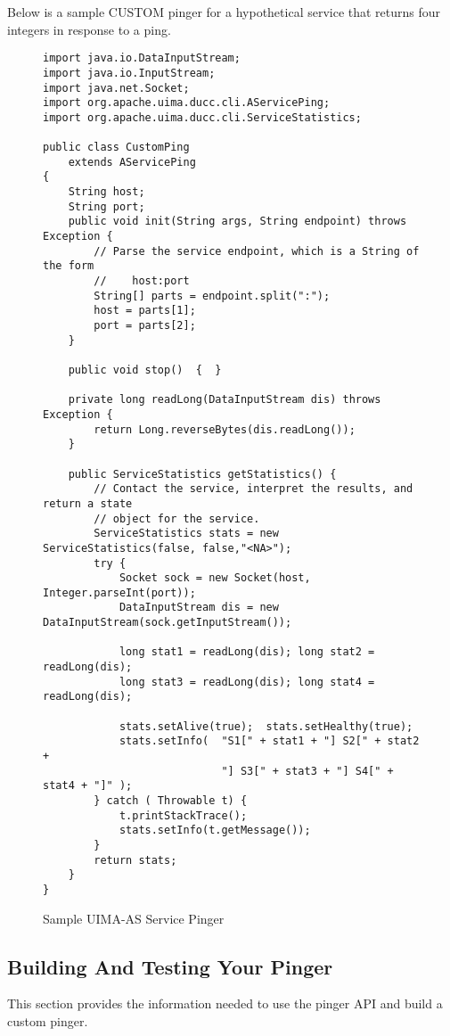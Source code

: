       Below is a sample CUSTOM pinger for a hypothetical service that returns four integers in
      response to a ping.
      \begin{figure}[H]
\begin{verbatim}
import java.io.DataInputStream;
import java.io.InputStream;
import java.net.Socket;
import org.apache.uima.ducc.cli.AServicePing;
import org.apache.uima.ducc.cli.ServiceStatistics;

public class CustomPing
    extends AServicePing
{
    String host;
    String port;
    public void init(String args, String endpoint) throws Exception {
        // Parse the service endpoint, which is a String of the form 
        //    host:port
        String[] parts = endpoint.split(":");
        host = parts[1];
        port = parts[2];
    }

    public void stop()  {  }

    private long readLong(DataInputStream dis) throws Exception {
        return Long.reverseBytes(dis.readLong());
    }

    public ServiceStatistics getStatistics() {
        // Contact the service, interpret the results, and return a state
        // object for the service.
        ServiceStatistics stats = new ServiceStatistics(false, false,"<NA>");
        try {
            Socket sock = new Socket(host, Integer.parseInt(port));
            DataInputStream dis = new DataInputStream(sock.getInputStream());

            long stat1 = readLong(dis); long stat2 = readLong(dis); 
            long stat3 = readLong(dis); long stat4 = readLong(dis);

            stats.setAlive(true);  stats.setHealthy(true);
            stats.setInfo(  "S1[" + stat1 + "] S2[" + stat2 + 
                            "] S3[" + stat3 + "] S4[" + stat4 + "]" );
        } catch ( Throwable t) {
        	t.printStackTrace();
            stats.setInfo(t.getMessage());
        }
        return stats;        
    }
}
\end{verbatim}
        \caption{Sample UIMA-AS Service Pinger}
        \label{fig:service.custom.pinger}

      \end{figure}
      
      \subsection{Building And Testing Your Pinger}
      This section provides the information needed to use the pinger API and build a
      custom pinger. 

